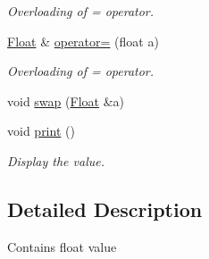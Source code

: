 \begin{DoxyCompactItemize}
\begin{DoxyCompactList}\small\item\em Overloading of = operator. \end{DoxyCompactList}\item 
\hypertarget{class_float_a4657b5b095492e5b6b129c7cd141ae2f}{\hyperlink{class_float}{Float} \& \hyperlink{class_float_a4657b5b095492e5b6b129c7cd141ae2f}{operator=} (float a)}\label{class_float_a4657b5b095492e5b6b129c7cd141ae2f}

\begin{DoxyCompactList}\small\item\em Overloading of = operator. \end{DoxyCompactList}\item 
void \hyperlink{class_float_a9498f1c10f20fd2b9cd8773f578cffae}{swap} (\hyperlink{class_float}{Float} \&a)
\item 
\hypertarget{class_float_a257109ef6ca9d662f9fb86b2f4a76d0c}{void \hyperlink{class_float_a257109ef6ca9d662f9fb86b2f4a76d0c}{print} ()}\label{class_float_a257109ef6ca9d662f9fb86b2f4a76d0c}

\begin{DoxyCompactList}\small\item\em Display the value. \end{DoxyCompactList}\end{DoxyCompactItemize}


\subsection{Detailed Description}
Contains float value 

